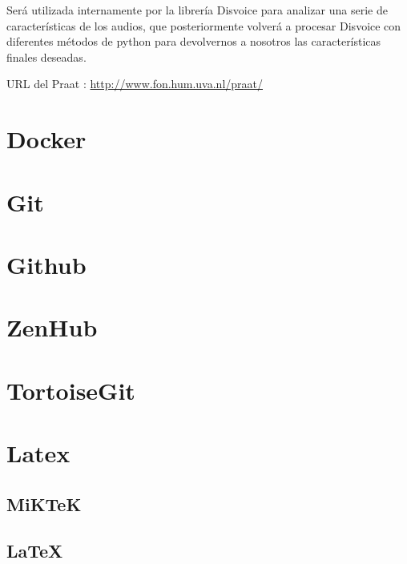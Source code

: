 Será utilizada internamente por la librería Disvoice para analizar una serie de características de los audios, que posteriormente volverá a procesar Disvoice con diferentes métodos de python para devolvernos a nosotros las características finales deseadas.

URL del Praat : \url{http://www.fon.hum.uva.nl/praat/}

\section{Docker}


\section{Git}


\section{Github}


\section{ZenHub}


\section{TortoiseGit}


\section{Latex}


\subsection{MiKTeK}


\subsection{\LaTeX}